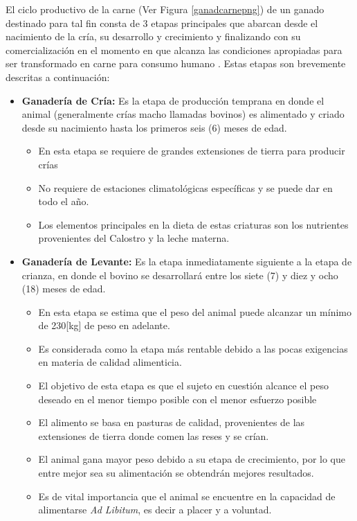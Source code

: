 El ciclo productivo de la carne (Ver Figura \ref{ganadcarnepng})  de un ganado destinado para tal fin consta de 3 etapas principales que abarcan desde el nacimiento de la cría, su desarrollo y crecimiento y finalizando con su comercialización en el momento en que alcanza las condiciones apropiadas para ser transformado en carne para consumo humano \cite{mahecha}. Estas etapas son brevemente descritas a continuación:


\begin{itemize}
	\item \textbf{Ganadería de Cría:} Es la etapa de producción temprana en donde el animal (generalmente crías macho llamadas bovinos) es alimentado y criado desde su nacimiento hasta los primeros seis (6) meses de edad.
	\begin{itemize}
		\item En esta etapa se requiere de grandes extensiones de tierra para producir crías
		\item No requiere de estaciones climatológicas específicas y se puede dar en todo el año.
		\item Los elementos principales en la dieta de estas criaturas son los nutrientes provenientes del Calostro y la leche materna.
	\end{itemize}
	\item \textbf{Ganadería de Levante:} Es la etapa inmediatamente siguiente a la etapa de crianza, en donde el bovino se desarrollará entre los siete (7) y diez y ocho (18) meses de edad.
	\begin{itemize}
		\item En esta etapa se estima que el peso del animal puede alcanzar un mínimo de 230[kg] de peso en adelante.
		\item Es considerada como la etapa más rentable debido a las  pocas exigencias en materia de calidad alimenticia.
		\item El objetivo de esta etapa es que el sujeto en cuestión alcance el peso deseado en el menor tiempo posible con el menor esfuerzo posible
		\item El alimento se basa en pasturas de calidad, provenientes de las extensiones de tierra donde comen las reses y se crían.
		\item El animal gana mayor peso debido a su etapa de crecimiento, por lo que entre mejor sea su alimentación se obtendrán mejores resultados.
		\item Es de vital importancia que el animal se encuentre en la capacidad de  alimentarse \textit{Ad Libitum}, es decir a placer y a voluntad.

\end{itemize}
\end{itemize}
